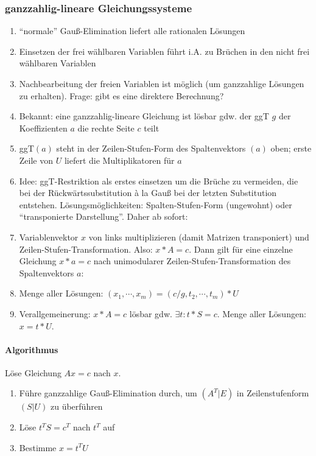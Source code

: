 \subsubsection{ganzzahlig-lineare Gleichungssysteme}\label{sec:gls-algorithmus}
\begin{enumerate}
	\item ``normale'' Gauß-Elimination liefert alle rationalen Lösungen
	\item Einsetzen der frei wählbaren Variablen führt i.A. zu Brüchen in den nicht frei wählbaren Variablen
	\item Nachbearbeitung der freien Variablen ist möglich (um ganzzahlige Lösungen zu erhalten).
		Frage: gibt es eine direktere Berechnung?
	\item Bekannt: eine ganzzahlig-lineare Gleichung ist lösbar gdw. der ggT $g$ der Koeffizienten $a$ die rechte Seite $c$ teilt
	\item ggT$(a)$ steht in der Zeilen-Stufen-Form des Spaltenvektors $(a)$ oben; erste Zeile von $U$ liefert die Multiplikatoren für $a$
	\item Idee: ggT-Restriktion als erstes einsetzen um die Brüche zu vermeiden,
		die bei der Rückwärtssubstitution \`a la Gauß bei der letzten Substitution entstehen.
		Lösungsmöglichkeiten: Spalten-Stufen-Form (ungewohnt) oder ``transponierte Darstellung''.
		Daher ab sofort:
	\item Variablenvektor $x$ von links multiplizieren (damit Matrizen transponiert) und Zeilen-Stufen-Transformation.
		Also: $x*A = c$. Dann gilt für eine einzelne Gleichung $x*a=c$ nach unimodularer Zeilen-Stufen-Transformation des Spaltenvektors $a$:
		\label{itm:gls-rueckfuehrung}
	\item Menge aller Lösungen: $(x_1,\cdots,x_m) = (c/g,t_2,\cdots,t_m)* U$
	\item Verallgemeinerung: $x*A = c$ lösbar gdw. $\exists t: t*S = c$. Menge aller Lösungen: $x = t*U$.
		\label{itm:gls-formeln}
\end{enumerate}

\paragraph{Algorithmus}

Löse Gleichung $Ax=c$ nach $x$.\begin{enumerate}
    \item Führe ganzzahlige Gauß-Elimination durch, um $(A^T|E)$ in Zeilenstufenform
        $(S|U)$ zu überführen
    \item Löse $t^TS=c^T$ nach $t^T$ auf
    \item Bestimme $x=t^TU$
\end{enumerate}


